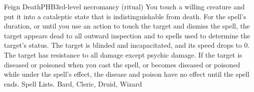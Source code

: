 \begin{spell}{Feign Death}{PHB}{3rd-level necromancy (ritual)}
{
}
You touch a willing creature and put it into a cataleptic state that is indistinguishable from death.
For the spell’s duration, or until you use an action to touch the target and dismiss the spell, the target appears dead to all outward inspection and to spells used to determine the target’s status. The target is blinded and incapacitated, and its speed drops to 0. The target has resistance to all damage except psychic damage. If the target is diseased or poisoned when you cast the spell, or becomes diseased or poisoned while under the spell’s effect, the disease and poison have no effect until the spell ends.
Spell Lists. Bard, Cleric, Druid, Wizard
\end{spell}

